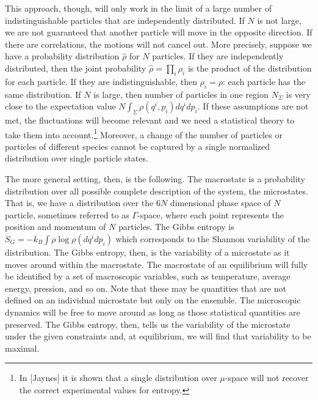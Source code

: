 \documentclass{article}
\begin{document}
This approach, though, will only work in the limit of a large number of indistinguishable particles that are independently distributed. If $N$ is not large, we are not guaranteed that another particle will move in the opposite direction. If there are correlations, the motions will not cancel out. More precisely, suppose we have a probability distribution $\hat{\rho}$ for $N$ particles. If they are independently distributed, then the joint probability $\hat{\rho}=\prod_{i}\rho_i$ is the product of the distribution for each particle. If they are indistinguishable, then $\rho_i=\rho$: each particle has the same distribution. If $N$ is large, then number of particles in one region $N_\Sigma$ is very close to the expectation value $N\int_\Sigma \rho(q^i, p_i)dq^idp_i$. If these assumptions are not met, the fluctuations will become relevant and we need a statistical theory to take them into account.\footnote{In [Jaynes] it is shown that a single distribution over $\mu$-space will not recover the correct experimental values for entropy.} Moreover, a change of the number of particles or particles of different species cannot be captured by a single normalized distribution over single particle states.

The more general setting, then, is the following. The macrostate is a probability distribution over all possible complete description of the system, the microstates. That is, we have a distribution over the $6N$ dimensional phase space of $N$ particle, sometimes referred to as $\Gamma$-space, where each point represents the position and momentum of $N$ particles. The Gibbs entropy is $S_G = -k_B \int \rho \log \rho (dq^idp_i)$ which corresponds to the Shannon variability of the distribution. The Gibbs entropy, then, is the variability of a microstate as it moves around within the macrostate. The macrostate of an equilibrium will fully be identified by a set of macroscopic variables, such as temperature, average energy, pression, and so on. Note that these may be quantities that are not defined on an individual microstate but only on the ensemble. The microscopic dynamics will be free to move around as long as those statistical quantities are preserved. The Gibbs entropy, then, tells us the variability of the microstate under the given constraints and, at equilibrium, we will find that variability to be maximal.
\end{document}
